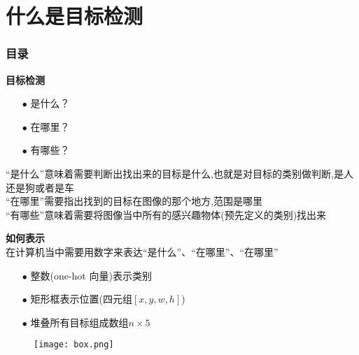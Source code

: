 \section{什么是目标检测}

\begin{frame}[allowframebreaks]
    \frametitle{\textsc{目录}} \vspace{-0.3cm}
    \begin{spacing}{0.0}
    \end{spacing}   %
\end{frame}



\begin{frame}
    \noindent\large\textbf{目标检测}
    \vspace{0.4cm}
    \begin{itemize}
        \item[$ \bullet $] 是什么？
        \item[$ \bullet $] 在哪里？
        \item[$ \bullet $] 有哪些？
    \end{itemize}
    \vspace{1cm}
    “是什么”意味着需要判断出找出来的目标是什么,也就是对目标的类别做判断,是人还是狗或者是车\\
    \vspace{1em}
    “在哪里”需要指出找到的目标在图像的那个地方,范围是哪里\\
    \vspace{1em}
    “有哪些”意味着需要将图像当中所有的感兴趣物体(预先定义的类别)找出来\\
\end{frame}

\begin{frame}
    \noindent\large\textbf{如何表示}\\
    在计算机当中需要用数字来表达“是什么”、“在哪里”、“在哪里”
    \vspace{1em}
    \begin{itemize}
        \item[$ \bullet $] 整数(one-hot 向量)表示类别
        \item[$ \bullet $] 矩形框表示位置(四元组$[x,y,w,h]$)
        \item[$ \bullet $] 堆叠所有目标组成数组$n\times5$
    \end{itemize}
    \vspace{1em}
    \begin{figure}
        \texttt{[image: box.png]}
    \end{figure}
\end{frame}

